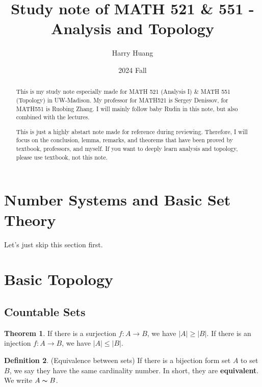 \documentclass[12pt,a4paper]{article}
\author{Harry Huang}
\title{Study note of MATH 521 \& 551 - Analysis and Topology}
\date{2024 Fall}
\theoremstyle{definition}
\newtheorem{thm}{Theorem}[subsection]
\newtheorem{dfn}[thm]{Definition}
\begin{document}
\maketitle

\begin{abstract}
    This is my study note especially made for MATH 521 (Analysis I) \& MATH 551 (Topology) in UW-Madison. My professor for MATH521 is Sergey Denissov, for MATH551 is Ruobing Zhang. I will mainly follow baby Rudin in this note, but also combined with the lectures.
    \par This is just a highly abstart note made for reference during reviewing. Therefore, I will focus on the conclusion, lemma, remarks, and theorems that have been proved by textbook, professors, and myself. If you want to deeply learn analysis and topology, please use textbook, not this note.
\end{abstract}

\section{Number Systems and Basic Set Theory}

Let's just skip this section first.

\section{Basic Topology}

\subsection{Countable Sets}

\begin {thm}
    If there is a surjection $f: A \rightarrow B$, we have $|A| \geq |B|$. If there is an injection $f: A \rightarrow B$, we have $|A| \leq |B|$. 
\end {thm}

\begin{dfn} (Equivalence between sets)
    \hspace{0em}
    If there is a bijection form set $A$ to set $B$, we say they have the same cardinality number.
    In short, they are \textbf{equivalent}. We write $A \thicksim B$.
\end{dfn}
\end{document}
